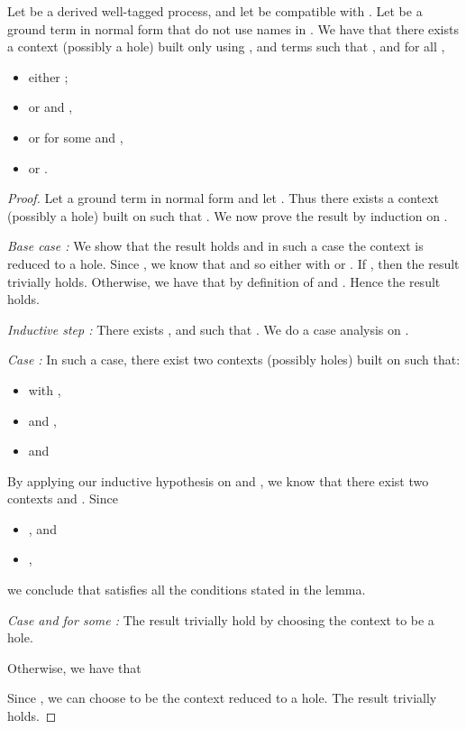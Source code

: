 \begin{lemma}
  \label{lem : deductibily of fct_C}
 {Let  be a derived well-tagged process, and let  be compatible with .} Let  be a ground term in normal form that do not use names in . We have that there exists a context  (possibly a hole) built only using , and terms  such that , and for all ,
  \begin{itemize}
  \item either ;
  \item or  and ,
  \item or  for some  and ,
  \item or .
  \end{itemize}
\end{lemma}

\begin{proof}
 Let  a ground term in normal form and let . Thus there exists a context  (possibly a hole) built
 on  such that . We now prove the result by
 induction on .

 \medskip

 \noindent \emph{Base case :} 
We show that the result holds and in such a case the context  is
reduced to a hole.
Since , we know that  and so
 either  with  or
 . 
If , then the
result trivially holds. Otherwise, we have 
that  by definition of
 and . Hence the result holds.


 \medskip

 \noindent \emph{Inductive step :} There exists , and  such that . We do a case analysis on .

\smallskip{}

 \emph{Case :} In such a case, there exist
 two contexts   (possibly holes) built on  such that:
\begin{itemize}
\item   with , 
\item  and ,
\item  and 
\end{itemize}
By applying our inductive hypothesis on  and , we know that
there exist two contexts  and .
Since 
\begin{itemize}
\item , and 
\item  , 
\end{itemize}
we conclude
   that  satisfies all the conditions
   stated in the lemma.
  

\smallskip{}

 \emph{Case  and  for some :}
 The result trivially hold by choosing the context  to be a hole.

\smallskip{}

Otherwise, we have that 
 
Since , we can choose  to be the context reduced
to a hole. 
The result trivially holds.
\end{proof}




